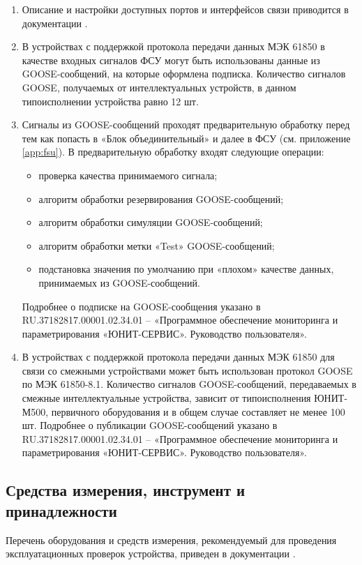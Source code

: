 \begin{enumerate}[label=\arabic{section}.\arabic{subsection}.\arabic*, labelsep=4pt, leftmargin=0pt, itemindent=57pt]

\item
\sloppy Описание и настройки доступных портов и интерфейсов связи приводится в документации \ManualUnitGeneral.

\item
В устройствах с поддержкой протокола передачи данных МЭК 61850 в качестве входных сигналов ФСУ могут быть использованы данные из GOOSE-сообщений, на которые оформлена подписка.
Количество сигналов GOOSE, получаемых от интеллектуальных устройств, в данном типоисполнении устройства равно 12 шт.

\item
Сигналы из GOOSE-сообщений проходят предварительную обработку перед тем как попасть в «Блок объединительный» и далее в ФСУ (см. приложение \ref{app:fsu}).
В предварительную обработку входят следующие операции:
\begin{itemize}
\item проверка качества принимаемого сигнала;
\item алгоритм обработки резервирования GOOSE-сообщений;
\item алгоритм обработки симуляции GOOSE-сообщений;
\item алгоритм обработки метки «Test» GOOSE-сообщений;
\item подстановка значения по умолчанию при «плохом» качестве данных, принимаемых из GOOSE-сообщений.
\end{itemize}
Подробнее о подписке на GOOSE-сообщения указано в RU.37182817.00001.02.34.01 – «Программное обеспечение мониторинга и параметрирования «ЮНИТ-СЕРВИС». Руководство пользователя».

\item 
В устройствах с поддержкой протокола передачи данных МЭК 61850 для связи со смежными устройствами может быть использован протокол GOOSE по МЭК 61850-8.1.
Количество сигналов GOOSE-сообщений, передаваемых в смежные интеллектуальные устройства, зависит от типоисполнения ЮНИТ-М500, первичного оборудования и в общем случае составляет не менее 100 шт.
Подробнее о публикации GOOSE-сообщений указано в RU.37182817.00001.02.34.01 – «Программное обеспечение мониторинга и параметрирования «ЮНИТ-СЕРВИС». Руководство пользователя».

\end{enumerate}

\color{unidarkgreen}\subsection{Средства измерения, инструмент и принадлежности}\color{black}
Перечень оборудования и средств измерения, рекомендуемый для проведения эксплуатационных проверок устройства, приведен в документации \ManualUnitGeneral.

